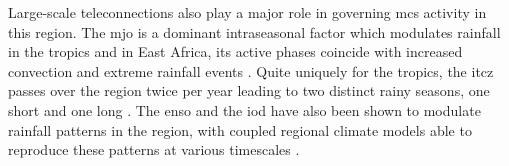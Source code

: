 Large-scale \glspl{teleconnection} also play a major role in governing \acrshort{mcs} activity in this region. The \acrfull{mjo} is a dominant intraseasonal factor which modulates rainfall in the tropics and in East Africa, its active phases coincide with increased convection and extreme rainfall events \citep{Pohl2006,Ochieng2023}. Quite uniquely for the tropics, the \acrfull{itcz} passes over the region twice per year leading to two distinct rainy seasons, one short and one long \citep{Palmer2023,Tefera2025}. The \acrfull{enso} and the \acrfull{iod} have also been shown to modulate rainfall patterns in the region, with coupled regional climate models able to reproduce these patterns at various timescales \citep{Vashisht2021,Dubache2019,Endris2019}.


